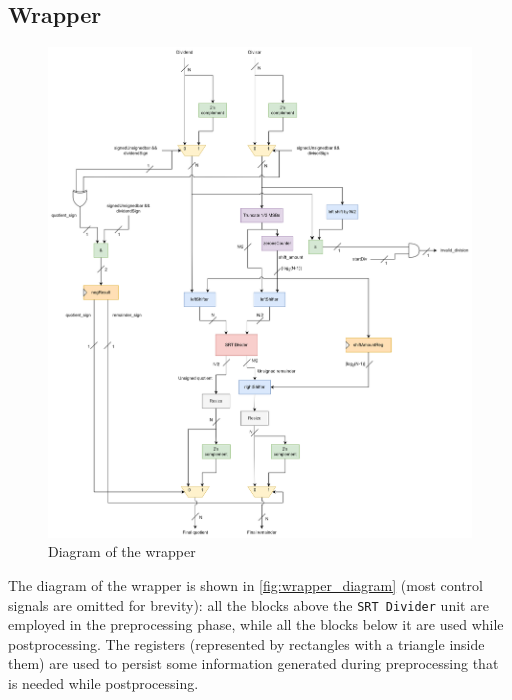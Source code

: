 \subsection{Wrapper}
\begin{figure}
    \centering
    \includegraphics[width=150mm]{images/SRTWrapper.png}
    \caption{Diagram of the wrapper}
    \label{fig:wrapper_diagram}
\end{figure}
The diagram of the wrapper is shown in \autoref{fig:wrapper_diagram} (most control signals are omitted for brevity): all the blocks above the \texttt{SRT Divider} unit are employed in the preprocessing phase, while all the blocks below it are used while postprocessing.
The registers (represented by rectangles with a triangle inside them) are used to persist some information generated during preprocessing that is needed while postprocessing.

